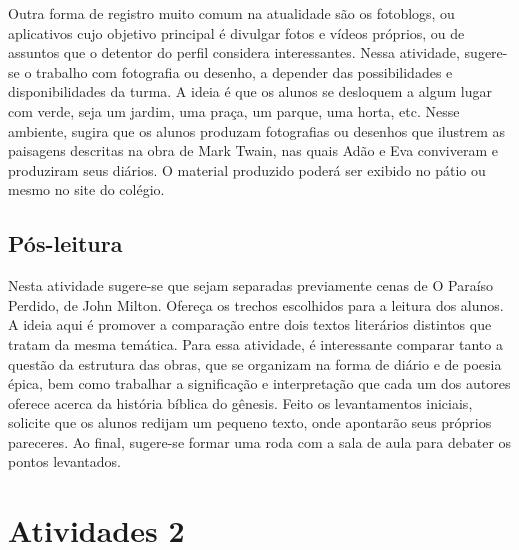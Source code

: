\documentclass[12pt]{extarticle}
\begin{document}
Outra forma de registro muito comum na atualidade são os
fotoblogs, ou aplicativos cujo objetivo principal é divulgar fotos e
vídeos próprios, ou de assuntos que o detentor do perfil considera
interessantes. Nessa atividade, sugere-se o trabalho com fotografia ou
desenho, a depender das possibilidades e disponibilidades da turma. A
ideia é que os alunos se desloquem a algum lugar com verde, seja um
jardim, uma praça, um parque, uma horta, etc. Nesse ambiente, sugira que
os alunos produzam fotografias ou desenhos que ilustrem as paisagens
descritas na obra de Mark Twain, nas quais Adão e Eva conviveram e
produziram seus diários. O material produzido poderá ser exibido no
pátio ou mesmo no site do colégio.


\subsection{Pós-leitura}


Nesta atividade sugere-se que sejam separadas previamente
cenas de O Paraíso Perdido, de John Milton. Ofereça os trechos
escolhidos para a leitura dos alunos. A ideia aqui é promover a
comparação entre dois textos literários distintos que tratam da mesma
temática. Para essa atividade, é interessante comparar tanto a questão
da estrutura das obras, que se organizam na forma de diário e de poesia
épica, bem como trabalhar a significação e interpretação que cada um dos
autores oferece acerca da história bíblica do gênesis. Feito os
levantamentos iniciais, solicite que os alunos redijam um pequeno texto,
onde apontarão seus próprios pareceres. Ao final, sugere-se formar uma
roda com a sala de aula para debater os pontos levantados.


\section{Atividades 2}
\end{document}
